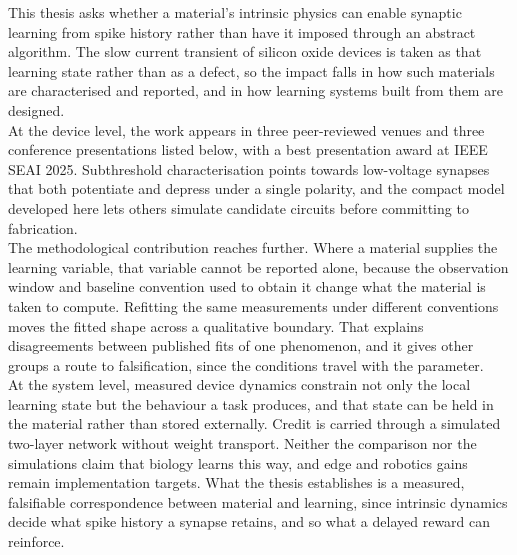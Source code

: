 
\begin{impact}      

\noindent This thesis asks whether a material's intrinsic physics can enable synaptic learning from spike history rather than have it imposed through an abstract algorithm. The slow current transient of silicon oxide devices is taken as that learning state rather than as a defect, so the impact falls in how such materials are characterised and reported, and in how learning systems built from them are designed.\\

\noindent At the device level, the work appears in three peer-reviewed venues and three conference presentations listed below, with a best presentation award at IEEE SEAI 2025. Subthreshold characterisation points towards low-voltage
synapses that both potentiate and depress under a single polarity, and the compact model developed here lets others simulate candidate circuits before committing to fabrication.\\

\noindent The methodological contribution reaches further. Where a material supplies the learning variable, that variable cannot be reported alone, because the observation window and baseline convention used to obtain it change what the material is taken to compute. Refitting the same measurements under different conventions moves the fitted shape across a qualitative boundary. That explains disagreements between published fits of one phenomenon, and it gives other groups a route to falsification, since the conditions travel with the parameter.\\

\noindent At the system level, measured device dynamics constrain not only the local learning state but the behaviour a task produces, and that state can be held in the material rather than stored externally. Credit
is carried through a simulated two-layer network without weight transport. Neither the comparison nor the simulations claim that biology learns this way, and edge and robotics gains remain implementation targets. What the thesis establishes is a measured, falsifiable correspondence between material and learning, since intrinsic dynamics decide what spike history a synapse retains, and so what a delayed reward can reinforce.\\

\clearpage
\thispagestyle{empty}

\end{impact}
